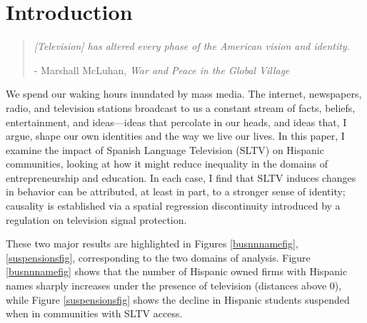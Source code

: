 \documentclass[11pt]{article}
\begin{document}
\newsavebox{\tablebox} \newlength{\tableboxwidth}

\setlength{\baselineskip}{22pt}

\renewcommand{\thefootnote}{\fnsymbol{footnote}}


\thispagestyle{empty}

\newpage 
\renewcommand{\thefootnote}{\arabic{footnote}}

\pagebreak 
\setcounter{page}{0}


\onehalfspacing


\newpage

\setcounter{page}{1}
\section{Introduction}

\begin{quotation}
\textit{[Television] has altered every phase of the American vision and identity. }
\begin{flushright} - Marshall McLuhan, \textit{War and Peace in the Global Village}\end{flushright}
\end{quotation}

We spend our waking hours inundated by mass media. The internet, newspapers, radio, and television stations broadcast to us a constant stream of facts, beliefs, entertainment, and ideas---ideas that percolate in our heads, and ideas that, I argue, shape our own identities and the way we live our lives. In this paper, I examine the impact of Spanish Language Television (SLTV) on Hispanic communities, looking at how it might reduce inequality in the domains of entrepreneurship and education. In each case, I find that SLTV induces changes in behavior can be attributed, at least in part, to a stronger sense of identity; causality is established via a spatial regression discontinuity introduced by a regulation on television signal protection.

These two major results are highlighted in Figures \ref{busnnnamefig}, \ref{suspensionsfig}, corresponding to the two domains of analysis. Figure \ref{busnnnamefig} shows that the number of Hispanic owned firms with Hispanic names sharply increases under the presence of television (distances above $0$), while Figure \ref{suspensionsfig} shows the decline in Hispanic students suspended when in communities with SLTV access.
\end{document}
